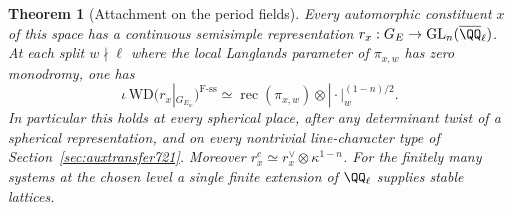 \documentclass[a4paper,11pt]{article}
\newtheorem{theorem}[proposition]{Theorem}
\theoremstyle{definition}
\theoremstyle{remark}
\numberwithin{equation}{section}
\newcommand{\GL}{\operatorname{GL}}
\begin{document}
\begin{theorem}[Attachment on the period fields]\leavevmode
\label{thm:splitattachment722}
Every automorphic constituent \(x\) of this space has a continuous
semisimple representation \(r_x:G_E\to\GL_n(\overline{\QQ}_\ell)\).
At each split \(w\nmid\ell\) where the local Langlands parameter of
\(\pi_{x,w}\) has zero monodromy, one has
\[
 \iota\,\mathrm{WD}(r_x|_{G_{E_w}})^{\mathrm{F\text{-}ss}}
       \simeq
       \operatorname{rec}(\pi_{x,w})\otimes
                                 |\cdot|_w^{(1-n)/2}.
\]
In particular this holds at every spherical place, after any
determinant twist of a spherical representation, and on every
nontrivial line-character type of Section~\ref{sec:auxtransfer721}.
Moreover \(r_x^c\simeq r_x^\vee\otimes\kappa^{1-n}\).
For the finitely many systems at the chosen level a single
finite extension of \(\QQ_\ell\) supplies stable lattices.
\end{theorem}
\end{document}
